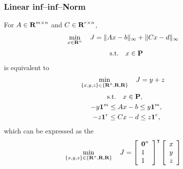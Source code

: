 \documentclass{article}
\begin{document}
\subsubsection{Linear inf--inf--Norm}

    For $A\in\textbf{R}^{m\times n}$ and $C\in\textbf{R}^{r\times n}$,
    \begin{align*}
        \min_{x\in\textbf{R}^n}\quad J & = \|A x-b\|_\infty + \|C x - d\|_\infty
    \end{align*}
    \begin{align*}
        \text{s.t.}\quad x\in\textbf{P}
    \end{align*}
    is equivalent to
    \begin{align*}
    \min_{\{x,y,z\}\in\{\textbf{R}^n,\textbf{R},\textbf{R}\}}
    \quad J & = y + z
    \end{align*}
    \begin{align*}
        \text{s.t.}\quad &x\in\textbf{P},
        \\
        -y\textbf{1}^m \leq A &x - b \leq y\textbf{1}^m,\\
        -z\textbf{1}^r \leq C &x - d \leq z\textbf{1}^r,
    \end{align*}
    which can be expressed as the \LP
    \begin{align*}
        \min_{\{x,y,z\}\in\{\textbf{R}^n,\textbf{R},\textbf{R}\}} \quad 
        J & = 
        \left[\begin{array}{l}
            \textbf{0}^n
            \\
            1
            \\
            1
        \end{array}\right]^\intercal
        \left[\begin{array}{c}
            x   \\
            y \\
            z
        \end{array}\right]
    \end{align*}
\end{document}
